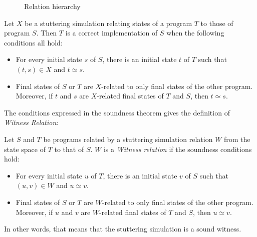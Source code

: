 \begin{figure}[ht]
  \begin{mdframed}
    \vspace{1cm}
    \centering
    \vspace{1cm}
  \end{mdframed}
  \caption{Relation hierarchy}
  \label{fig:relations}
\end{figure}

\begin{ftheorem}
\label{thm:soundness}
Let $X$ be a stuttering simulation relating states of a program $T$ to those of program $S$. Then $T$ is a correct implementation of $S$ when the following conditions all hold:
\begin{itemize}
  \item For every initial state $s$ of $S$, there is an initial state $t$ of $T$ such that $(t, s) \in X $ and $ t \simeq s$.
  \item Final states of $S$ or $T$ are $X$-related to only final states of the other program. Moreover, if $t$ and $s$ are $X$-related final states of $T$ and $S$, then $t \simeq s$.
\end{itemize}
\end{ftheorem}

The conditions expressed in the soundness theorem gives the definition of \emph{Witness Relation}:

\begin{fdefinition}[Witness]
Let $S$ and $T$ be programs related by a stuttering simulation relation $W$ from the state space of $T$ to that of $S$. $W$ is a \emph{Witness relation} if the soundness conditions hold:
\begin{itemize}
  \item For every initial state $u$ of $T$, there is an initial state $v$ of $S$ such that $(u,v) \in W $ and $ u \simeq v$.
  \item Final states of $S$ or $T$ are $W$-related to only final states of the other program. Moreover, if $u$ and $v$ are $W$-related final states of $T$ and $S$, then $u \simeq v$.
\end{itemize}
In other words, that means that the stuttering simulation is a sound witness.
\end{fdefinition}


